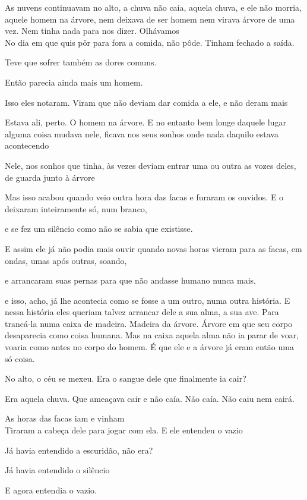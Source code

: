As nuvens continuavam no alto, a chuva não caía, aquela chuva, e ele não
morria, aquele homem na árvore, nem deixava de ser homem nem virava
árvore de uma vez. Nem tinha nada para nos dizer. Olhávamos\\

No dia em que quis pôr para fora a comida, não pôde. Tinham fechado a
saída.

Teve que sofrer também as dores comuns.

Então parecia ainda mais um homem.

Isso eles notaram. Viram que não deviam dar comida a ele, e não deram
mais

Estava ali, perto. O homem na árvore. E no entanto bem longe daquele
lugar alguma coisa mudava nele, ficava nos seus sonhos onde nada daquilo
estava acontecendo

Nele, nos sonhos que tinha, às vezes deviam entrar uma ou outra as vozes
deles, de guarda junto à árvore

Mas isso acabou quando veio outra hora das facas e furaram os ouvidos. E
o deixaram inteiramente só, num branco,

e se fez um silêncio como não se sabia que existisse.

E assim ele já não podia mais ouvir quando novas horas vieram para as
facas, em ondas, umas após outras, soando,

e arrancaram suas pernas para que não andasse humano nunca mais,

e isso, acho, já lhe acontecia como se fosse a um outro, numa outra
história. E nessa história eles queriam talvez arrancar dele a sua alma,
a sua ave. Para trancá-la numa caixa de madeira. Madeira da árvore.
Árvore em que seu corpo desaparecia como coisa humana. Mas na caixa
aquela alma não ia parar de voar, voaria como antes no corpo do homem. É
que ele e a árvore já eram então uma só coisa.

No alto, o céu se mexeu. Era o sangue dele que finalmente ia cair?

Era aquela chuva. Que ameaçava cair e não caía. Não caía. Não caiu nem
cairá.

As horas das facas iam e vinham\\

Tiraram a cabeça dele para jogar com ela. E ele entendeu o vazio

Já havia entendido a escuridão, não era?

Já havia entendido o silêncio

E agora entendia o vazio.

